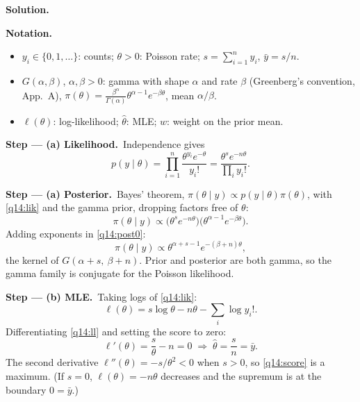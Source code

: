 \documentclass[11pt,a4paper]{article}
\numberwithin{equation}{questao}   %
\newenvironment{notacao}{\par\smallskip\noindent\textbf{Notation.}\begin{itemize}[leftmargin=1.4em,topsep=1pt,itemsep=0pt]\small}{\end{itemize}}
\newcommand{\passo}[2]{\par\smallskip\noindent\textbf{Step --- #1.}~#2}
\newcommand{\solhead}{\par\medskip\noindent{\color{blue!55!black}\rule{\linewidth}{0.3pt}}\par\noindent\textbf{Solution.}}
\newcommand{\1}{\mathbf{1}}
\begin{document}
\begin{sol}
\solhead
\begin{notacao}
\item $y_i\in\{0,1,\dots\}$: counts; $\theta>0$: Poisson rate; $s=\sum_{i=1}^ny_i$, $\bar y=s/n$.
\item $G(\alpha,\beta)$, $\alpha,\beta>0$: gamma with shape $\alpha$ and rate $\beta$ (Greenberg's
  convention, App.~A), $\pi(\theta)=\frac{\beta^\alpha}{\Gamma(\alpha)}\theta^{\alpha-1}e^{-\beta\theta}$,
  mean $\alpha/\beta$.
\item $\ell(\theta)$: log-likelihood; $\hat\theta$: MLE; $w$: weight on the prior mean.
\end{notacao}

\passo{(a) Likelihood}{Independence gives}
\begin{equation}\label{q14:lik}
p(y\mid\theta)=\prod_{i=1}^n\frac{\theta^{y_i}e^{-\theta}}{y_i!}=\frac{\theta^{s}e^{-n\theta}}{\prod_iy_i!}.
\end{equation}

\passo{(a) Posterior}{Bayes' theorem, $\pi(\theta\mid y)\propto p(y\mid\theta)\pi(\theta)$, with
\eqref{q14:lik} and the gamma prior, dropping factors free of $\theta$:}
\begin{equation}\label{q14:post0}
\pi(\theta\mid y)\propto\big(\theta^{s}e^{-n\theta}\big)\big(\theta^{\alpha-1}e^{-\beta\theta}\big).
\end{equation}
Adding exponents in \eqref{q14:post0}:
\begin{equation}\label{q14:post}
\pi(\theta\mid y)\propto\theta^{\alpha+s-1}e^{-(\beta+n)\theta},
\end{equation}
the kernel of $G(\alpha+s,\ \beta+n)$. Prior and posterior are both gamma, so the gamma family is
conjugate for the Poisson likelihood.

\passo{(b) MLE}{Taking logs of \eqref{q14:lik}:}
\begin{equation}\label{q14:ll}
\ell(\theta)=s\log\theta-n\theta-\sum_i\log y_i!.
\end{equation}
Differentiating \eqref{q14:ll} and setting the score to zero:
\begin{equation}\label{q14:score}
\ell'(\theta)=\frac{s}{\theta}-n=0\;\Longrightarrow\;\hat\theta=\frac{s}{n}=\bar y .
\end{equation}
The second derivative $\ell''(\theta)=-s/\theta^2<0$ when $s>0$, so \eqref{q14:score} is a maximum. (If
$s=0$, $\ell(\theta)=-n\theta$ decreases and the supremum is at the boundary $0=\bar y$.)


\end{sol}
\end{document}

